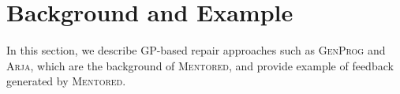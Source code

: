 \documentclass[10pt,conference]{IEEEtran}
\begin{document}



\section{Background and Example}
    In this section, we describe GP-based repair approaches such as \textsc{GenProg} and \textsc{Arja}, which are the background of \textsc{Mentored}, and provide example of feedback generated by \textsc{Mentored}.
\end{document}
